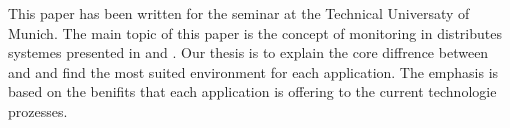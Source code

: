 This paper has been written for the seminar \isdslong at the Technical Universaty of Munich. The main topic of this paper is the concept of monitoring in distributes systemes presented in \ambshort and \chukshort. Our thesis is to explain the core diffrence between \ambshort and \chukshort and find the most suited environment for each application. The emphasis is based on the benifits that each application is offering to the current technologie prozesses.